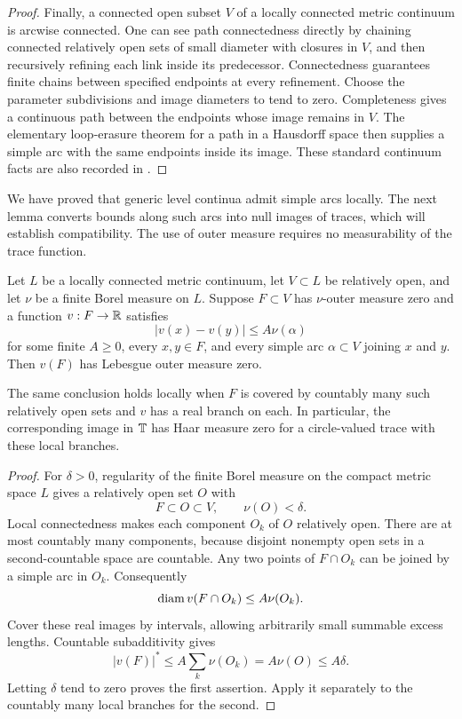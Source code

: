 \begin{proof}
Finally, a connected open subset $V$ of a locally connected metric
continuum is arcwise connected.  One can see path connectedness
directly by chaining connected relatively open sets of small diameter
with closures in $V$, and then recursively refining each link inside
its predecessor.  Connectedness guarantees finite chains between
specified endpoints at every refinement.  Choose the parameter
subdivisions and image diameters to tend to zero.  Completeness gives
a continuous path between the endpoints whose image remains in $V$.
The elementary loop-erasure theorem for a path in a Hausdorff space
then supplies a simple arc with the same endpoints inside its image.
These standard continuum facts are also recorded in
\cite{Whyburn1942}.
\end{proof}

We have proved that generic level continua admit simple arcs locally.
The next lemma converts bounds along such arcs into null images of
traces, which will establish compatibility.  The use of outer measure
requires no measurability of the trace function.

\begin{lemma}\label{lem:trace-null}
Let $L$ be a locally connected metric continuum, let $V\subset L$
be relatively open, and let $\nu$ be a finite Borel measure on $L$.
Suppose $F\subset V$ has $\nu$-outer measure zero and a function
$v:F\to\mathbb R$ satisfies
\[
 |v(x)-v(y)|\le A\nu(\alpha)
\]
for some finite $A\ge0$, every $x,y\in F$, and every simple arc
$\alpha\subset V$ joining $x$ and $y$.  Then $v(F)$ has Lebesgue
outer measure zero.

The same conclusion holds locally when $F$ is covered by countably
many such relatively open sets and $v$ has a real branch on each.
In particular, the corresponding image in $\mathbb T$ has Haar measure
zero for a circle-valued trace with these local branches.
\end{lemma}

\begin{proof}
For $\delta>0$, regularity of the finite Borel measure on the compact
metric space $L$ gives a relatively open set $O$ with
\[
 F\subset O\subset V,\qquad \nu(O)<\delta.
\]
Local connectedness makes each component $O_k$ of $O$ relatively
open.  There are at most countably many components, because disjoint
nonempty open sets in a second-countable space are countable.
Any two points of $F\cap O_k$ can be joined by a simple arc in $O_k$.
Consequently
\[
 \operatorname{diam} v(F\cap O_k)\le A\nu(O_k).
\]
Cover these real images by intervals, allowing arbitrarily small
summable excess lengths.  Countable subadditivity gives
\[
 |v(F)|^*\le A\sum_k\nu(O_k)=A\nu(O)\le A\delta.
\]
Letting $\delta$ tend to zero proves the first assertion.  Apply it
separately to the countably many local branches for the second.
\end{proof}

